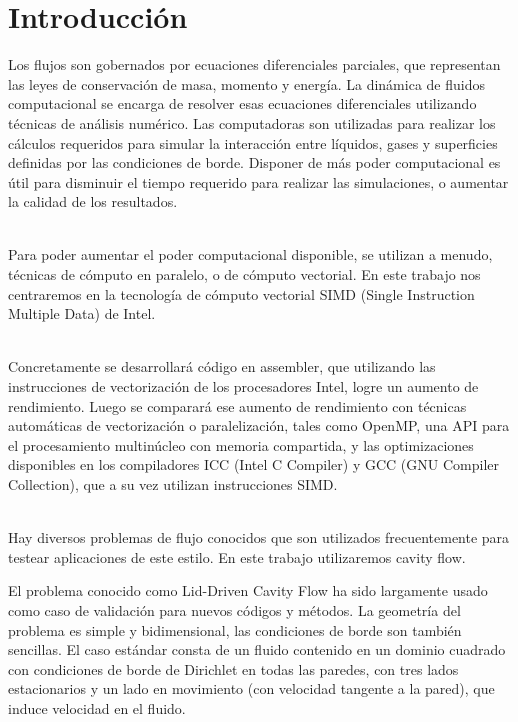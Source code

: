 \section{Introducción}
Los flujos son gobernados por ecuaciones diferenciales parciales, que representan las leyes de conservación de masa, momento y energía. La dinámica de fluidos computacional se encarga de resolver esas ecuaciones diferenciales utilizando técnicas de análisis numérico. Las computadoras son utilizadas para realizar los cálculos requeridos para simular la interacción entre líquidos, gases y superficies definidas por las condiciones de borde. Disponer de más poder computacional es útil para disminuir el tiempo requerido para realizar las simulaciones, o aumentar la calidad de los resultados.

~\\
Para poder aumentar el poder computacional disponible, se utilizan a menudo, técnicas de cómputo en paralelo, o de cómputo vectorial. En este trabajo nos centraremos en la tecnología de cómputo vectorial SIMD (Single Instruction Multiple Data) de Intel.

~\\
Concretamente se desarrollará código en assembler, que utilizando las instrucciones de vectorización de los procesadores Intel, logre un aumento de rendimiento. Luego se comparará ese aumento de rendimiento con técnicas automáticas de vectorización o paralelización, tales como OpenMP, una API para el procesamiento multinúcleo con memoria compartida, y las optimizaciones disponibles en los compiladores ICC (Intel C Compiler) y GCC (GNU Compiler Collection), que a su vez utilizan instrucciones SIMD.

~\\
Hay diversos problemas de flujo conocidos que son utilizados frecuentemente para testear aplicaciones de este estilo. En este trabajo utilizaremos cavity flow.

El problema conocido como Lid-Driven Cavity Flow ha sido largamente usado como caso de validación para nuevos códigos y métodos. La geometría del problema es simple y bidimensional, las condiciones de borde son también sencillas. El caso estándar consta de un fluido contenido en un dominio cuadrado con condiciones de borde de Dirichlet en todas las paredes, con tres lados estacionarios y un lado en movimiento (con velocidad tangente a la pared), que induce velocidad en el fluido.
